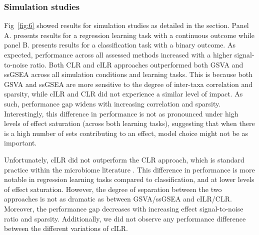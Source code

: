 \documentclass[10pt,letterpaper]{article}
\begin{document}
\subsubsection*{Simulation studies}
Fig~\ref{fig:6} showed results for simulation studies as detailed in the  section. Panel A. presents results for a regression learning task with a continuous outcome while panel B. presents results for a classification task with a binary outcome. As expected, performance across all assessed methods increased with a higher signal-to-noise ratio. Both CLR and cILR approaches outperformed both GSVA and ssGSEA across all simulation conditions and learning tasks. This is because both GSVA and ssGSEA are more sensitive to the degree of inter-taxa correlation and sparsity, while cILR and CLR did not experience a similar level of impact. As such, performance gap widens with increasing correlation and sparsity. Interestingly, this difference in performance is not as pronounced under high levels of effect saturation (across both learning tasks), suggesting that when there is a high number of sets contributing to an effect, model choice might not be as important.   

Unfortunately, cILR did not outperform the CLR approach, which is standard practice within the microbiome literature \cite{gloor2017}. This difference in performance is more notable in regression learning tasks compared to classification, and at lower levels of effect saturation. However, the degree of separation between the two approaches is not as dramatic as between GSVA/ssGSEA and cILR/CLR. Moreover, the performance gap decreases with increasing effect signal-to-noise ratio and sparsity. Additionally, we did not observe any performance difference between the different variations of cILR. 
\end{document}
